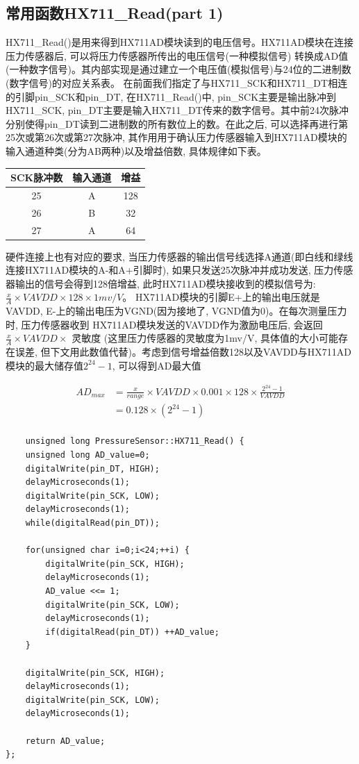 \documentclass{article}
\begin{document}
\subsection{常用函数HX711\_Read(part 1)}
HX711\_Read()是用来得到HX711AD模块读到的电压信号。HX711AD模块在连接压力传感器后, 可以将压力传感器所传出的电压信号(一种模拟信号)
转换成AD值(一种数字信号)。其内部实现是通过建立一个电压值(模拟信号)与24位的二进制数(数字信号)的对应关系表。 
在前面我们指定了与HX711\_SCK和HX711\_DT相连的引脚pin\_SCK和pin\_DT, 在HX711\_Read()中, pin\_SCK主要是输出脉冲到
HX711\_SCK, pin\_DT主要是输入HX711\_DT传来的数字信号。其中前24次脉冲分别使得pin\_DT读到二进制数的所有数位上的数。在此之后,
可以选择再进行第25次或第26次或第27次脉冲, 其作用用于确认压力传感器输入到HX711AD模块的输入通道种类(分为AB两种)以及增益倍数, 
具体规律如下表。

\begin{tabular}{|c|c|c|}
\hline
SCK脉冲数&输入通道&增益\\
\hline
25&A&128\\
\hline
26&B&32\\
\hline
27&A&64\\
\hline
\end{tabular}

硬件连接上也有对应的要求, 当压力传感器的输出信号线选择A通道(即白线和绿线连接HX711AD模块的A-和A+引脚时), 如果只发送25次脉冲并成功发送,
压力传感器输出的信号会得到128倍增益, 此时HX711AD模块接收到的模拟信号为:$\frac{x}{A} \times VAVDD\times 128\times 1 mv/V $。
HX711AD模块的引脚E+上的输出电压就是VAVDD, E-上的输出电压为VGND(因为接地了, VGND值为0)。在每次测量压力时, 压力传感器收到
HX711AD模块发送的VAVDD作为激励电压后, 会返回$\frac{x}{A} \times VAVDD \times$ 灵敏度 (这里压力传感器的灵敏度为1mv/V, 
具体值的大小可能存在误差, 但下文用此数值代替)。考虑到信号增益倍数128以及VAVDD与HX711AD模块的最大储存值$2^{24}-1$, 可以得到AD最大值

\begin{equation}
	\begin{aligned}
		AD_{max} &= \frac{x}{range} \times VAVDD \times 0.001 \times 128 \times \frac{2^{24}-1}{VAVDD} \\
	     		 &= 0.128 \times (2^{24}-1)\\
	\end{aligned}
\end{equation}

\begin{lstlisting}
	unsigned long PressureSensor::HX711_Read() {
  	unsigned long AD_value=0;
	digitalWrite(pin_DT, HIGH);
	delayMicroseconds(1);
	digitalWrite(pin_SCK, LOW);
	delayMicroseconds(1);
	while(digitalRead(pin_DT)); 
	
	for(unsigned char i=0;i<24;++i) {
		digitalWrite(pin_SCK, HIGH); 
		delayMicroseconds(1);
		AD_value <<= 1; 
		digitalWrite(pin_SCK, LOW); 
		delayMicroseconds(1);
		if(digitalRead(pin_DT)) ++AD_value; 
	}
	
	digitalWrite(pin_SCK, HIGH); 
	delayMicroseconds(1);
	digitalWrite(pin_SCK, LOW); 
	delayMicroseconds(1);

	return AD_value;
};
\end{lstlisting}
\end{document}
